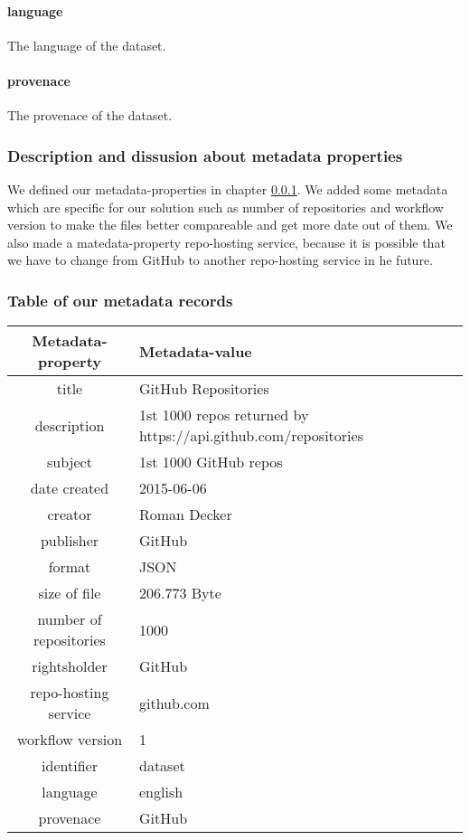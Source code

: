\paragraph{language}
The language of the dataset.
\paragraph{provenace}
The provenace of the dataset.

\subsubsection{Description and dissusion about metadata properties}\label{sec:propertielist}

We defined our metadata-properties in chapter \ref{sec:propertielist}. We added
some metadata which are specific for our solution such as number of repositories
and workflow version to make the files better compareable and get more date out
of them. We also made a matedata-property repo-hosting service, because it is
possible that we have to change from GitHub to another repo-hosting service in
he future.


\subsubsection{Table of our metadata records}\label{sec:metadatarecordtable}

\begin{tabular}{ c | l}
    \textbf{Metadata-property} & \textbf{Metadata-value} \\
    \hline
    title & GitHub Repositories \\
    \hline
    description & 1st 1000 repos returned by https://api.github.com/repositories  \\
    \hline
    subject & 1st 1000 GitHub repos \\
    \hline
    date created & 2015-06-06 \\
    \hline
     creator & Roman Decker \\
    \hline
     publisher & GitHub \\
    \hline
     format & JSON \\
    \hline
     size of file & 206.773 Byte \\
    \hline
     number of repositories & 1000 \\
    \hline
     rightsholder & GitHub \\
    \hline
     repo-hosting service & github.com \\
    \hline
     workflow version & 1 \\
    \hline
     identifier & dataset \\
    \hline
     language & english \\
    \hline
     provenace & GitHub \\
    \hline
\end{tabular}
